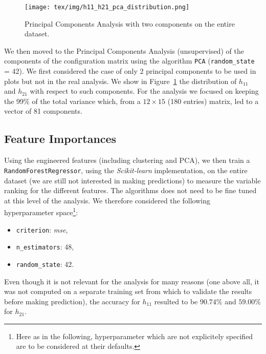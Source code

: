     \begin{figure}[!t]
        \centering
        \texttt{[image: tex/img/h11\_h21\_pca\_distribution.png]}
        \caption{Principal Components Analysis with two components on the entire dataset.}
        \label{fig:pca_analysis}
    \end{figure}
    
    We then moved to the Principal Components Analysis (unsupervised) of the components of the configuration matrix using the algorithm \texttt{PCA} (\texttt{random\_state} = 42). We first considered the case of only 2 principal components to be used in plots but not in the real analysis. We show in Figure~\ref{fig:pca_analysis} the distribution of $h_{11}$ and $h_{21}$ with respect to such components. For the analysis we focused on keeping the 99\% of the total variance which, from a $12 \times 15$ (180 entries) matrix, led to a vector of 81 components.
    
\subsection{Feature Importances}

    Using the engineered features (including clustering and PCA), we then train a \texttt{RandomForestRegressor}, using the \textit{Scikit-learn} implementation, on the entire dataset (we are still not interested in making predictions) to measure the variable ranking for the different features. The algorithms does not need to be fine tuned at this level of the analysis. We therefore considered the following hyperparameter space\footnote{Here as in the following, hyperparameter which are not explicitely specified are to be considered at their defaults.}:
    \begin{itemize}
        \item \texttt{criterion}: \textit{mse},
        \item \texttt{n\_estimators}: 48,
        \item \texttt{random\_state}: 42.
    \end{itemize}
    Even though it is not relevant for the analysis for many reasons (one above all, it was not computed on a separate training set from which to validate the results before making prediction), the accuracy for $h_{11}$ resulted to be $90.74\%$ and $59.00\%$ for $h_{21}$.
    
